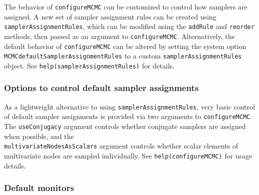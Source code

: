 \documentclass[12pt,oneside]{book}\usepackage[]{graphicx}\usepackage[]{color}
\def\cd#1{\texttt{#1}}
\begin{document}
The behavior of \cd{configureMCMC} can be customized to control how samplers are assigned.  A new set of sampler assignment rules can be created using \cd{samplerAssignmentRules}, which can be modified using the \cd{addRule} and \cd{reorder} methods, then passed as an argument to \cd{configureMCMC}.  Alternatively, the default behavior of \cd{configureMCMC} can be altered by setting the system option \cd{MCMCdefaultSamplerAssignmentRules} to a custom \cd{samplerAssignmentRules} object.  See \cd{help(samplerAssignmentRules)} for details.

\subsubsection{Options to control default sampler assignments}

As a lightweight alternative to using \cd{samplerAssignmentRules}, very basic control of default sampler assignments is provided via two arguments to \cd{configureMCMC}.  The \cd{useConjugacy} argument controls whether conjugate samplers are assigned when possible, and the \\
\cd{multivariateNodesAsScalars} argument controls whether scalar elements of multivariate nodes are sampled individually. See \cd{help(configureMCMC)} for usage details.



\subsubsection{Default monitors}
\end{document}
